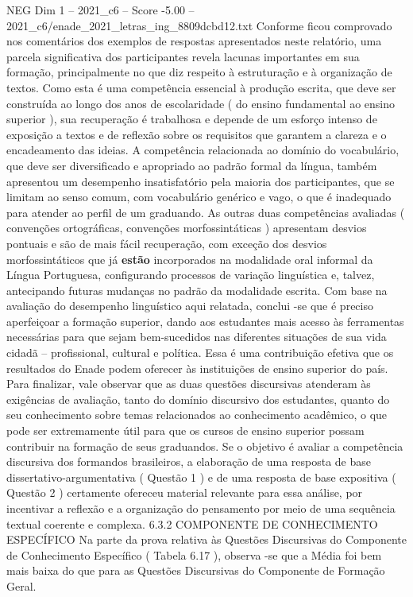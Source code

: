 \begin{textsample}{NEG Dim 1 – 2021\_c6 – Score -5.00 – 2021\_c6/enade\_2021\_letras\_ing\_8809dcbd12.txt}
Conforme ficou comprovado nos comentários dos exemplos de respostas apresentados neste relatório, uma parcela significativa dos participantes revela lacunas importantes em sua formação, principalmente no que diz respeito à estruturação e à organização de textos.
Como esta é uma competência essencial à produção escrita, que deve ser construída ao longo dos anos de escolaridade ( do ensino fundamental ao ensino superior ), sua recuperação é trabalhosa e depende de um esforço intenso de exposição a textos e de reflexão sobre os requisitos que garantem a clareza e o encadeamento das ideias.
A competência relacionada ao domínio do vocabulário, que deve ser diversificado e apropriado ao padrão formal da língua, também apresentou um desempenho insatisfatório pela maioria dos participantes, que se limitam ao senso comum, com vocabulário genérico e vago, o que é inadequado para atender ao perfil de um graduando.
As outras duas competências avaliadas ( convenções ortográficas, convenções morfossintáticas ) apresentam desvios pontuais e são de mais fácil recuperação, com exceção dos desvios morfossintáticos que já \textbf{estão} incorporados na modalidade oral informal da Língua Portuguesa, configurando processos de variação linguística e, talvez, antecipando futuras mudanças no padrão da modalidade escrita.
Com base na avaliação do desempenho linguístico aqui relatada, conclui -se que é preciso aperfeiçoar a formação superior, dando aos estudantes mais acesso às ferramentas necessárias para que sejam bem-sucedidos nas diferentes situações de sua vida cidadã – profissional, cultural e política.
Essa é uma contribuição efetiva que os resultados do Enade podem oferecer às instituições de ensino superior do país.
Para finalizar, vale observar que as duas questões discursivas atenderam às exigências de avaliação, tanto do domínio discursivo dos estudantes, quanto do seu conhecimento sobre temas relacionados ao conhecimento acadêmico, o que pode ser extremamente útil para que os cursos de ensino superior possam contribuir na formação de seus graduandos.
Se o objetivo é avaliar a competência discursiva dos formandos brasileiros, a elaboração de uma resposta de base dissertativo-argumentativa ( Questão 1 ) e de uma resposta de base expositiva ( Questão 2 ) certamente ofereceu material relevante para essa análise, por incentivar a reflexão e a organização do pensamento por meio de uma sequência textual coerente e complexa. 6.3.2 COMPONENTE DE CONHECIMENTO ESPECÍFICO Na parte da prova relativa às Questões Discursivas do Componente de Conhecimento Específico ( Tabela 6.17 ), observa -se que a Média foi bem mais baixa do que para as Questões Discursivas do Componente de Formação Geral.

\end{textsample}
